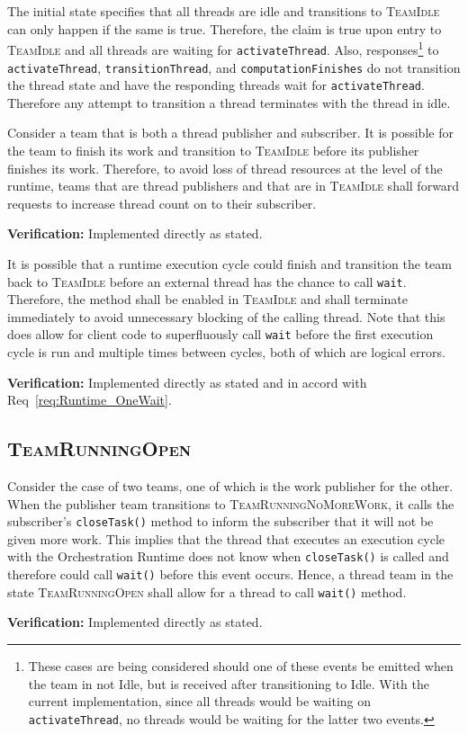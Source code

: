 \documentclass{article}
\newcommand{\TeamIdle}          {\textsc{TeamIdle}}
\newcommand{\TeamRunningOpen}   {\textsc{TeamRunningOpen}}
\newcommand{\TeamRunningNoMoreWork} {\textsc{TeamRunningNoMoreWork}}
\begin{document}
The initial state specifies that all threads are idle and transitions to
{\TeamIdle} can only happen if the same is true.  Therefore, the claim is true
upon entry to {\TeamIdle} and all threads are waiting for \texttt{activateThread}.
Also, responses\footnote{These cases are being considered should one of these
events be emitted when the team in not Idle, but is received after transitioning
to Idle.  With the current implementation, since all threads would be waiting on
\texttt{activateThread}, no threads would be waiting for the latter two events.}
to \texttt{activateThread}, \texttt{transitionThread}, and
\texttt{computationFinishes} do not transition the thread state and have the
responding threads wait for \texttt{activateThread}.  Therefore any attempt to
transition a thread terminates with the thread in idle.

\begin{req}
Consider a team that is both a thread publisher and subscriber.  It is possible
for the team to finish its work and transition to {\TeamIdle} before its
publisher finishes its work.  Therefore, to avoid loss of thread resources at
the level of the runtime, teams that are thread publishers and that are in
{\TeamIdle} shall forward requests to increase thread count on to their
subscriber.
\end{req}
\textbf{Verification:}\hspace{0.125in}  Implemented directly as stated.

\begin{req}
It is possible that a runtime execution cycle could finish and transition the
team back to {\TeamIdle} before an external thread has the chance to call
\texttt{wait}.  Therefore, the method shall be enabled in {\TeamIdle} and shall
terminate immediately to avoid unnecessary blocking of the calling thread.  Note
that this does allow for client code to superfluously call \texttt{wait} before
the first execution cycle is run and multiple times between cycles, both of
which are logical errors.
\end{req}
\textbf{Verification:}\hspace{0.125in}  Implemented directly as stated and in
accord with Req~\ref{req:Runtime_OneWait}.  

\subsection{\TeamRunningOpen}
\begin{req}
Consider the case of two teams, one of which is the work publisher for the
other.  When the publisher team transitions to {\TeamRunningNoMoreWork}, it
calls the subscriber's \texttt{closeTask()} method to inform the subscriber that
it will not be given more work.  This implies that the thread that executes an
execution cycle with the Orchestration Runtime does not know when
\texttt{closeTask()} is called and therefore could call \texttt{wait()} before
this event occurs.  Hence, a thread team in the state {\TeamRunningOpen} shall
allow for a thread to call \texttt{wait()} method.
\end{req}
\textbf{Verification:}\hspace{0.125in}  Implemented directly as stated.
\end{document}
